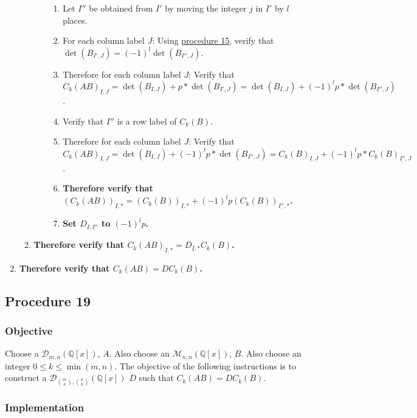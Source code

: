 \documentclass[twocolumn]{article}
\newcommand{\ul}[1]{\underline{#1}}
\newcommand{\procedure}[2][]{\subsection*{Procedure #2 \ifthenelse{\equal{#1}{}}{}{(#1)}}\label{sec:procedure #2}}
\newcommand{\objective}{\subsubsection*{Objective}}
\newcommand{\implementation}{\subsubsection*{Implementation}}
\begin{document}
\begin{enumerate}
\begin{enumerate}
\begin{enumerate}
\begin{enumerate}
								\item Let $I''$ be obtained from $I'$ by moving the integer $j$ in $I'$ by $l$ places.
								\item For each column label $J$: Using \hyperref[sec:procedure 15]{procedure 15}, verify that $\det(B_{I',J})=(-1)^l\det(B_{I'',J})$.
								\item Therefore for each column label $J$: Verify that ${C_k(AB)}_{\ul{I},\ul{J}}=\det(B_{I,J})+p*\det(B_{I',J})=\det(B_{I,J})+(-1)^lp*\det(B_{I'',J})$.
								\item Verify that $I''$ is a row label of $C_k(B)$.
								\item Therefore for each column label $J$: Verify that ${C_k(AB)}_{\ul{I},\ul{J}}=\det(B_{I,J})+(-1)^lp*\det(B_{I'',J})={C_k(B)}_{\ul{I},\ul{J}}+(-1)^lp*{C_k(B)}_{\ul{I''},\ul{J}}$.
								\item \textbf{Therefore verify that $(C_k(AB))_{\ul{I},*}=(C_k(B))_{\ul{I},*}+(-1)^lp(C_k(B))_{\ul{I''},*}$.}
								\item \textbf{Set $D_{\ul{I},\ul{I''}}$ to $(-1)^lp$.}
							\end{enumerate}
						\end{enumerate}
						\item \textbf{Therefore verify that ${C_k(AB)}_{\ul{I},*}=D_{\ul{I},*}C_k(B)$.}
					\end{enumerate}
					\item \textbf{Therefore verify that $C_k(AB)=DC_k(B)$.}
				\end{enumerate}
		\procedure{19}
			\objective
				Choose a $\mathcal{D}_{m,n}(\mathbb{Q}[x])$, $A$. Also choose an $\mathcal{M}_{n,n}(\mathbb{Q}[x])$, $B$. Also choose an integer $0\le k\le\min(m,n)$. The objective of the following instructions is to construct a $\mathcal{D}_{\binom{m}{k},\binom{n}{k}}(\mathbb{Q}[x])$ $D$ such that $C_k(AB)=DC_k(B)$.
			\implementation
\end{document}
